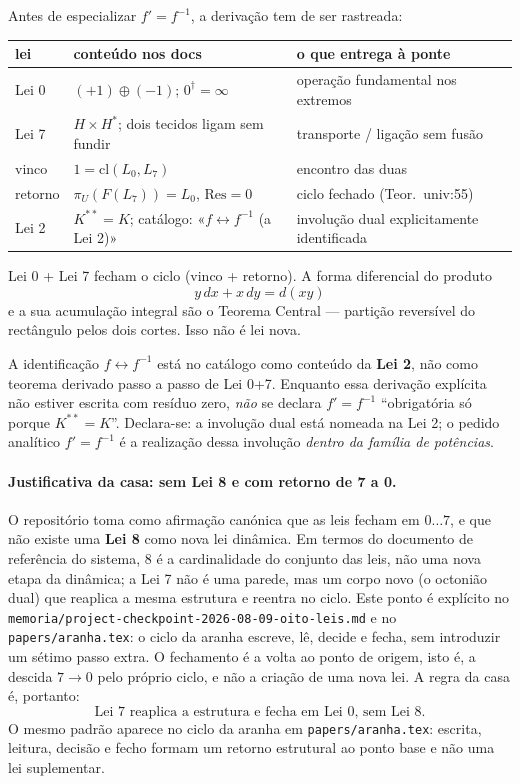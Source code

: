 \documentclass[11pt,a4paper]{article}
\begin{document}
Antes de especializar $f'=f^{-1}$, a derivação tem de ser rastreada:

\begin{center}
\renewcommand{\arraystretch}{1.25}
\begin{tabular}{@{}llp{7.5cm}@{}}
\toprule
lei & conteúdo nos docs & o que entrega à ponte \\
\midrule
Lei 0 & $(+1)\oplus(-1)$; $0^\dagger=\infty$ &
operação fundamental nos extremos \\
Lei 7 & $H\times H^*$; dois tecidos ligam sem fundir &
transporte / ligação sem fusão \\
vinco & $1=\mathrm{cl}(L_0,L_7)$ &
encontro das duas \\
retorno & $\pi_U(F(L_7))=L_0$, $\mathrm{Res}=0$ &
ciclo fechado (Teor.~univ:55) \\
Lei 2 & $K^{**}=K$; catálogo: «$f\leftrightarrow f^{-1}$ (a Lei 2)» &
involução dual explicitamente identificada \\
\bottomrule
\end{tabular}
\end{center}

Lei 0 + Lei 7 fecham o ciclo (vinco + retorno). A forma diferencial do produto
\[
y\,dx+x\,dy=d(xy)
\]
e a sua acumulação integral são o Teorema Central --- partição reversível do rectângulo
pelos dois cortes. Isso não é lei nova.

A identificação $f\leftrightarrow f^{-1}$ está no catálogo como conteúdo da \textbf{Lei 2},
não como teorema derivado passo a passo de Lei 0+7. Enquanto essa derivação explícita
não estiver escrita com resíduo zero, \emph{não} se declara $f'=f^{-1}$ ``obrigatória só porque
$K^{**}=K$''. Declara-se: a involução dual está nomeada na Lei 2; o pedido analítico
$f'=f^{-1}$ é a realização dessa involução \emph{dentro da família de potências}.

\paragraph{Justificativa da casa: sem Lei 8 e com retorno de 7 a 0.}
O repositório toma como afirmação canónica que as leis fecham em $0\ldots 7$, e que não existe
uma \textbf{Lei 8} como nova lei dinâmica. Em termos do documento de referência do sistema,
$8$ é a cardinalidade do conjunto das leis, não uma nova etapa da dinâmica; a Lei 7 não é uma
parede, mas um corpo novo (o octonião dual) que reaplica a mesma estrutura e reentra no ciclo.
Este ponto é explícito no \texttt{memoria/project-checkpoint-2026-08-09-oito-leis.md} e no \texttt{papers/aranha.tex}: o ciclo da aranha escreve, lê, decide e fecha, sem introduzir um
sétimo passo extra. O fechamento é a volta ao ponto de origem, isto é, a descida $7\to 0$ pelo
próprio ciclo, e não a criação de uma nova lei. A regra da casa é, portanto: 
\[
\boxed{\text{Lei 7 reaplica a estrutura e fecha em Lei 0, sem Lei 8}.}
\]
O mesmo padrão aparece no ciclo da aranha em \texttt{papers/aranha.tex}: escrita, leitura,
decisão e fecho formam um retorno estrutural ao ponto base e não uma lei suplementar.
\end{document}
